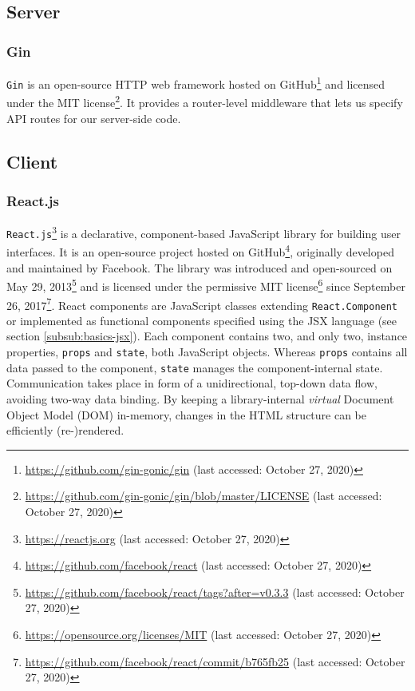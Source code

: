 \subsection{Server}
\label{sub:basics-server}

\subsubsection{Gin}
\label{subsub:basics-gin}

\texttt{Gin} is an open-source HTTP web framework hosted on GitHub\footnote{\url{https://github.com/gin-gonic/gin} (last accessed: October 27, 2020)} and licensed under the MIT license\footnote{\url{https://github.com/gin-gonic/gin/blob/master/LICENSE} (last accessed: October 27, 2020)}.
It provides a router-level middleware that lets us specify API routes for our server-side code.

\subsection{Client}
\label{sub:basics-client}

\subsubsection{React.js}
\label{subsub:basics-reactjs}

\texttt{React.js}\footnote{\url{https://reactjs.org} (last accessed: October 27, 2020)} is a declarative, component-based JavaScript library for building user interfaces. 
It is an open-source project hosted on GitHub\footnote{\url{https://github.com/facebook/react} (last accessed: October 27, 2020)}, originally developed and maintained by Facebook.
The library was introduced and open-sourced on May 29, 2013\footnote{\url{https://github.com/facebook/react/tags?after=v0.3.3} (last accessed: October 27, 2020)} and is licensed under the permissive MIT license\footnote{\url{https://opensource.org/licenses/MIT} (last accessed: October 27, 2020)} since September 26, 2017\footnote{\url{https://github.com/facebook/react/commit/b765fb25} (last accessed: October 27, 2020)}.
React components are JavaScript classes extending \texttt{React.Component} or implemented as functional components specified using the JSX language (see section \ref{subsub:basics-jsx}). Each component contains two, and only two, instance properties, \texttt{props} and \texttt{state}, both JavaScript objects. Whereas \texttt{props} contains all data passed to the component, \texttt{state} manages the component-internal state. Communication takes place in form of a unidirectional, top-down data flow, avoiding two-way data binding. By keeping a library-internal \textit{virtual} Document Object Model (DOM) in-memory, changes in the HTML structure can be efficiently (re-)rendered.

